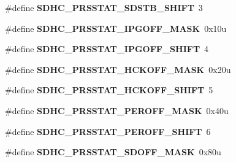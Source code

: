 \begin{DoxyCompactItemize}
\item 
\#define {\bfseries S\+D\+H\+C\+\_\+\+P\+R\+S\+S\+T\+A\+T\+\_\+\+S\+D\+S\+T\+B\+\_\+\+S\+H\+I\+FT}~3\hypertarget{group__SDHC__Register__Masks_ga4857c2040b9dc29336795fba391dd1ca}{}\label{group__SDHC__Register__Masks_ga4857c2040b9dc29336795fba391dd1ca}

\item 
\#define {\bfseries S\+D\+H\+C\+\_\+\+P\+R\+S\+S\+T\+A\+T\+\_\+\+I\+P\+G\+O\+F\+F\+\_\+\+M\+A\+SK}~0x10u\hypertarget{group__SDHC__Register__Masks_ga60c111aa5a4259d9b556a30aa9cbf891}{}\label{group__SDHC__Register__Masks_ga60c111aa5a4259d9b556a30aa9cbf891}

\item 
\#define {\bfseries S\+D\+H\+C\+\_\+\+P\+R\+S\+S\+T\+A\+T\+\_\+\+I\+P\+G\+O\+F\+F\+\_\+\+S\+H\+I\+FT}~4\hypertarget{group__SDHC__Register__Masks_gab62b9ee7261708d8741ea70ecb103520}{}\label{group__SDHC__Register__Masks_gab62b9ee7261708d8741ea70ecb103520}

\item 
\#define {\bfseries S\+D\+H\+C\+\_\+\+P\+R\+S\+S\+T\+A\+T\+\_\+\+H\+C\+K\+O\+F\+F\+\_\+\+M\+A\+SK}~0x20u\hypertarget{group__SDHC__Register__Masks_ga3fea3ced329a19b4f5ef4b596afa1487}{}\label{group__SDHC__Register__Masks_ga3fea3ced329a19b4f5ef4b596afa1487}

\item 
\#define {\bfseries S\+D\+H\+C\+\_\+\+P\+R\+S\+S\+T\+A\+T\+\_\+\+H\+C\+K\+O\+F\+F\+\_\+\+S\+H\+I\+FT}~5\hypertarget{group__SDHC__Register__Masks_gac28dd17af6a554003b82c5ef2a8a29ff}{}\label{group__SDHC__Register__Masks_gac28dd17af6a554003b82c5ef2a8a29ff}

\item 
\#define {\bfseries S\+D\+H\+C\+\_\+\+P\+R\+S\+S\+T\+A\+T\+\_\+\+P\+E\+R\+O\+F\+F\+\_\+\+M\+A\+SK}~0x40u\hypertarget{group__SDHC__Register__Masks_ga6561c88825587d265f09036e40dc741a}{}\label{group__SDHC__Register__Masks_ga6561c88825587d265f09036e40dc741a}

\item 
\#define {\bfseries S\+D\+H\+C\+\_\+\+P\+R\+S\+S\+T\+A\+T\+\_\+\+P\+E\+R\+O\+F\+F\+\_\+\+S\+H\+I\+FT}~6\hypertarget{group__SDHC__Register__Masks_ga5fbe36972520968a101550517bd82895}{}\label{group__SDHC__Register__Masks_ga5fbe36972520968a101550517bd82895}

\item 
\#define {\bfseries S\+D\+H\+C\+\_\+\+P\+R\+S\+S\+T\+A\+T\+\_\+\+S\+D\+O\+F\+F\+\_\+\+M\+A\+SK}~0x80u\hypertarget{group__SDHC__Register__Masks_ga97dde8a6d23e4744d4988349d9d6f581}{}\label{group__SDHC__Register__Masks_ga97dde8a6d23e4744d4988349d9d6f581}


\end{DoxyCompactItemize}
